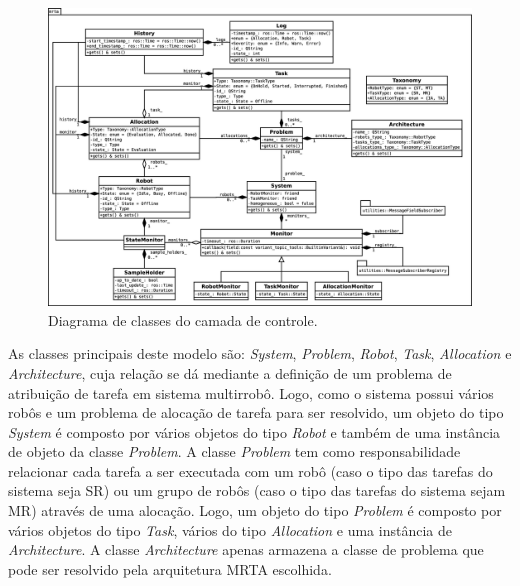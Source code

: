         \begin{figure}[p]
            \centering
            \includegraphics[height=\textwidth,angle=90]{Figuras/3_desenvolvimento/rqt_mrta_controller_uml.eps}
            \caption{Diagrama de classes do camada de controle.} \label{fig:rqt_mrta_controller_uml}
        \end{figure}
        
        As classes principais deste modelo são: \textit{System}, \textit{Problem}, \textit{Robot}, \textit{Task}, \textit{Allocation} e \textit{Architecture}, cuja relação se dá mediante a definição de um problema de atribuição de tarefa em sistema multirrobô. Logo, como o sistema possui vários robôs e um problema de alocação de tarefa para ser resolvido, um objeto do tipo \textit{System} é composto por vários objetos do tipo \textit{Robot} e também de uma instância de objeto da classe \textit{Problem}. A classe \textit{Problem} tem como responsabilidade relacionar cada tarefa a ser executada com um robô (caso o tipo das tarefas do sistema seja SR) ou um grupo de robôs (caso o tipo das tarefas do sistema sejam MR) através de uma alocação. Logo, um objeto do tipo \textit{Problem} é composto por vários objetos do tipo \textit{Task}, vários do tipo \textit{Allocation} e uma instância de \textit{Architecture}. A classe \textit{Architecture} apenas armazena a classe de problema que pode ser resolvido pela arquitetura MRTA escolhida. 
        
